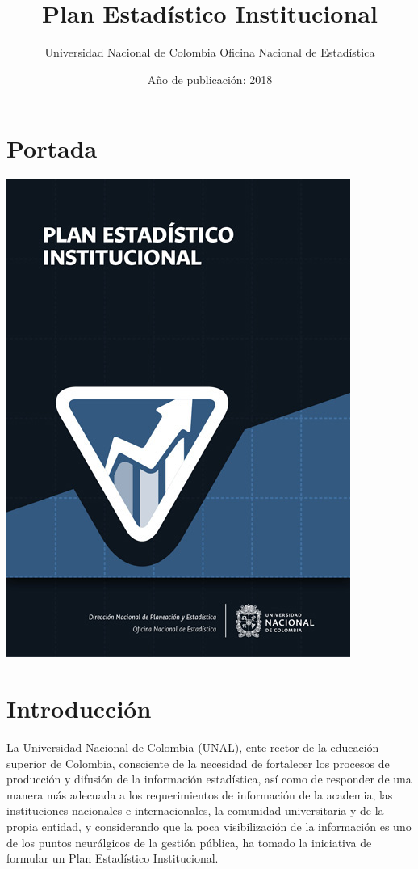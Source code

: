 \documentclass[
]{book}
\title{Plan Estadístico Institucional}
\author{ Universidad Nacional de Colombia Oficina Nacional de Estadística}
\date{Año de publicación: 2018}
\begin{document}
\maketitle

{
\setcounter{tocdepth}{1}
\tableofcontents
}
\hypertarget{portada}{%
\chapter*{Portada}\label{portada}}

\begin{center}\includegraphics[width=0.75\linewidth]{Imagenes/Portada Final} \end{center}

\hypertarget{intro}{%
\chapter{Introducción}\label{intro}}

La Universidad Nacional de Colombia (UNAL), ente rector de la educación superior de Colombia, consciente de la necesidad de fortalecer los procesos de producción y difusión de la información estadística, así como de responder de una manera más adecuada a los requerimientos de información de la academia, las instituciones nacionales e internacionales, la comunidad universitaria y de la propia entidad, y considerando que la poca visibilización de la información es uno de los puntos neurálgicos de la gestión pública, ha tomado la iniciativa de formular un Plan Estadístico Institucional.
\end{document}
